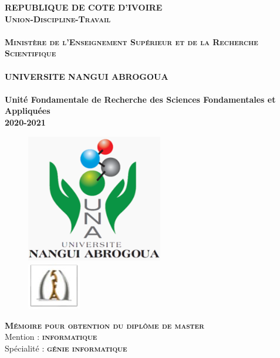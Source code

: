\begin{titlepage}
	\begin{center}
		{\bf \textsc{REPUBLIQUE DE COTE D'IVOIRE}\\
			\vspace*{2mm}		
			\textbf{\textsc{Union-Discipline-Travail}} \\
		}
		\hrulefill \\
		\textbf{\textsc{Minist\`ere de l\textquoteright Enseignement Sup\'erieur et de la Recherche Scientifique}} \\
		\hrulefill \\		
		\textbf{\textsc\LARGE {UNIVERSITE NANGUI ABROGOUA}}
		\\
		\hrulefill \\		
		\vspace*{2mm}		
		\textbf{\textsc\LARGE {Unit\'e Fondamentale de Recherche des Sciences Fondamentales et Appliqu\'ees}}\\[0.1cm]
		\vspace*{3mm}
		\textbf{\textsc{2020-2021}}
	\end{center}
	\begin{figure}[!h]
		\begin{minipage}[t]{.1\linewidth}
			\begin{flushleft}
				\begin{center}
					\includegraphics[scale=0.5]{images/una}
				\end{center}
			\end{flushleft}
		\end{minipage}
		\hfill
		\begin{minipage}[t]{.1\linewidth}
			\begin{flushright}
				\begin{center}
					\includegraphics[scale=0.5]{images/sfa}
				\end{center}    		
			\end{flushright}
		\end{minipage}
	\end{figure}
	\begin{center}
		\textbf{\textsc{M\'emoire pour obtention du diplôme de master}} 
		\\[0.1cm]
		Mention : \textbf{\textsc{informatique}}\\[0.05cm]
		Spécialité : \textbf{\textsc{génie informatique}}\\[0.05cm]
		

\end{center}
\end{titlepage}
